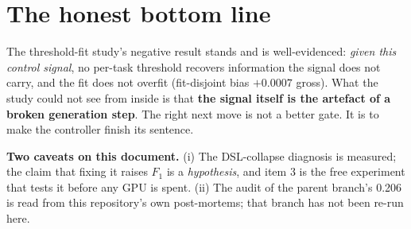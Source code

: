 \documentclass[11pt,a4paper]{article}
\newenvironment{keybox}{\begin{shaded}\noindent}{\end{shaded}}
\begin{document}
\section{The honest bottom line}

\begin{keybox}
The threshold-fit study's negative result stands and is well-evidenced: \emph{given this
control signal}, no per-task threshold recovers information the signal does not carry, and
the fit does not overfit (fit-disjoint bias $+0.0007$ gross). What the study could not see
from inside is that \textbf{the signal itself is the artefact of a broken generation step}.
The right next move is not a better gate. It is to make the controller finish its sentence.
\end{keybox}

\vspace{0.6em}
\noindent\small\textbf{Two caveats on this document.} (i) The DSL-collapse diagnosis is
measured; the claim that fixing it raises $F_1$ is a \emph{hypothesis}, and item 3 is the
free experiment that tests it before any GPU is spent. (ii) The audit of the parent branch's
0.206 is read from this repository's own post-mortems; that branch has not been re-run here.
\end{document}
